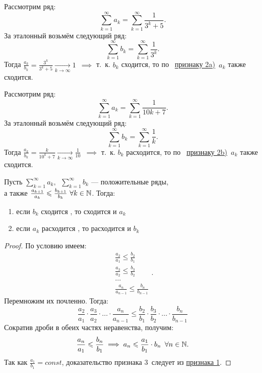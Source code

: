 \documentclass[../../main.tex]{subfiles}
\begin{document}
\begin{example}
	Рассмотрим ряд:
	\[
		 \sum\limits_{k = 1}^\infty a_k=  \sum\limits_{k = 1}^\infty\frac{1}{3^k + 5}
	.\]
	За эталонный возьмём следующий ряд:
	\[
		\sum\limits_{k = 1}^\infty b_k=   \sum\limits_{k = 1}^\infty\frac{1}{3^k}
	.\]
	Тогда $\frac{a_k}{b_k} = \frac{3^k}{3^k + 5} \xrightarrow[k \to \infty]{} 1$\ 
	$\implies$ т.~к. $b_k$ сходится, то по \  
	 \hyperref[lec26:comp_test_2]{признаку  2\textdegree a)}\ $a_k$ также сходится.
\end{example}
\begin{example}
	Рассмотрим ряд:
	\[
		 \sum\limits_{k = 1}^\infty a_k=  \sum\limits_{k = 1}^\infty\frac{1}{10k + 7}
	.\]
	За эталонный возьмём следующий ряд:
	\[
		\sum\limits_{k = 1}^\infty b_k=   \sum\limits_{k = 1}^\infty\frac{1}{k}
	.\]
	Тогда $\frac{a_k}{b_k} = \frac{k}{10^k + 7} \xrightarrow[k \to \infty]{} 
	\frac{1}{10}$\ 
	$\implies$ т.~к. $b_k$ расходится, то по \  
	 \hyperref[lec26:comp_test_2]{признаку  2\textdegree b)}\ $a_k$ также сходится.
\end{example}
\begin{thm}[Признак сравнения 3\textdegree]
 	\label{lec26:comp_test_3}
 	Пусть $\sum\limits_{k = 1}^\infty a_k,\enspace \sum\limits_{k = 1}^\infty b_k$
 	 --- положительные ряды,\\ 
 	а также $\frac{a_{k+1}}{a_k} \leq \frac{b_{k+1}}{b_k} \ 
 	\forall k \in \N$. Тогда:
	\begin{enumerate}[label={\alph*)}]
	\item если  $b_k$ сходится , то сходится и $a_k$
	\item если $a_k$ расходится , то расходится и $b_k$
	\end{enumerate}
\end{thm}
\begin{proof}
	По условию имеем:
 	\[
		\begin{array}{l}
			\frac{a_2}{a_1} \leq \frac{b_2}{b_1}\\
			\frac{a_3}{a_2} \leq \frac{b_3}{b_2}\\
			\dots\\
			\frac{a_n}{a_{n-1}} \leq \frac{b_n}{b_{n-1}}
		\end{array}		
	.\]
	Перемножим их почленно. Тогда:
	\[
		\frac{a_2}{a_1}\cdot\frac{a_3}{a_2}\cdot\ldots
		\cdot\frac{a_n}{a_{n-1}} \leq
		\frac{b_2}{b_1}\cdot\frac{b_3}{b_2}\cdot\ldots
		\cdot\frac{b_n}{b_{n-1}}
	\]
	Сократив дроби в обеих частях неравенства, получим:
	\[
		\frac{a_n}{a_1} \leqslant \frac{b_n}{b_1} \implies
		a_n \leqslant \frac{a_1}{b_1}\cdot b_n\enspace \forall n \in \mathbb{N}
	.\]
	Так как $ \frac{a_1}{b_1} = const$, 
	доказательство признака 3\textdegree \ следует из
	\hyperref[lec26:comp_test_1]{признака  1\textdegree}.
\end{proof}
\end{document}
